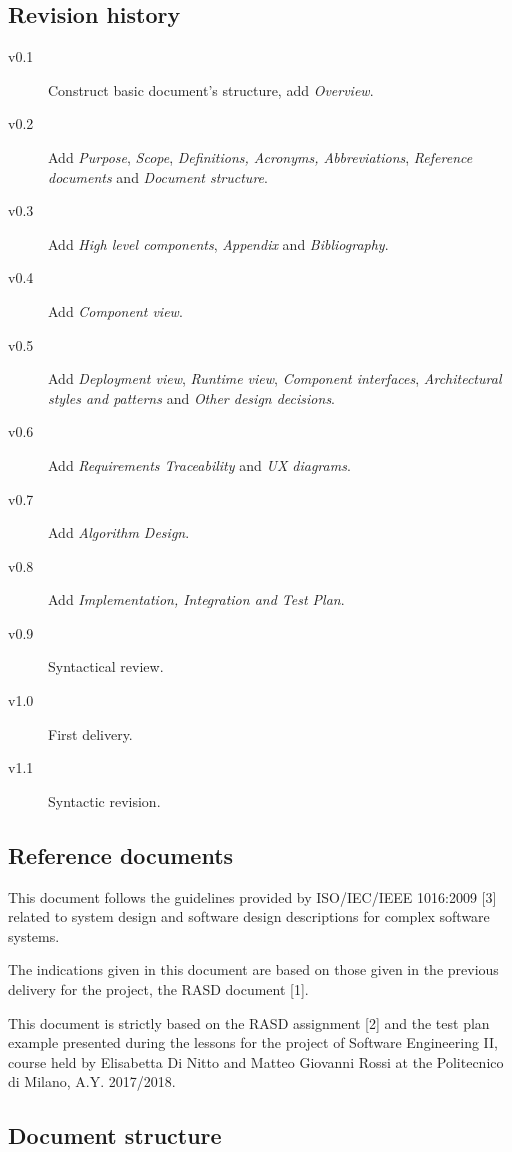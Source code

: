 \documentclass{article}
\begin{document}
	\subsection{Revision history}
	\begin{description}
		\item [v0.1] Construct basic document's structure, add \textit{Overview}.
		\item [v0.2] Add \textit{Purpose}, \textit{Scope}, \textit{Definitions, Acronyms, Abbreviations}, \textit{Reference documents} and \textit{Document structure}.
		\item [v0.3] Add \textit{High level components}, \textit{Appendix} and \textit{Bibliography}.
		\item [v0.4] Add \textit{Component view}.
		\item [v0.5] Add \textit{Deployment view}, \textit{Runtime view}, \textit{Component interfaces}, \textit{Architectural styles and patterns} and \textit{Other design decisions}.
		\item [v0.6] Add \textit{Requirements Traceability} and \textit{UX diagrams}.
		\item [v0.7] Add \textit{Algorithm Design}.
		\item [v0.8] Add \textit{Implementation, Integration and Test Plan}.
		\item [v0.9] Syntactical review.
		\item [v1.0] First delivery.
		\item [v1.1] Syntactic revision.
	\end{description}
	
	
	\subsection{Reference documents}
	This document follows the guidelines provided by ISO/IEC/IEEE 1016:2009 [3] related to system design and software design descriptions for complex software systems.

	\bigskip
	The indications given in this document are based on those given in the previous delivery for the project, the RASD document [1].
	
	\bigskip
	This document is strictly based on the RASD assignment [2] and the test plan example presented during the lessons for the project of Software Engineering II, course held by Elisabetta Di Nitto and Matteo Giovanni Rossi at the Politecnico di Milano, A.Y. 2017/2018.
	
	
	\subsection{Document structure}
\end{document}
